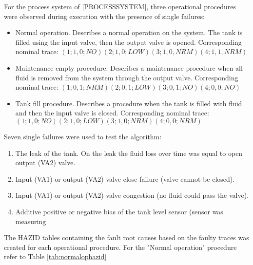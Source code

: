 \documentclass[conference]{IEEEtran}
\begin{document}
For the process system of \ref{PROCESSSYSTEM}, three operational procedures were observed during execution with the presence of single failures:
\begin{itemize}
\item Normal operation. Describes a normal operation on the system. The tank is filled using the input valve, then the output valve is opened. Corresponding nominal trace:
$(1;1,0;NO) (2;1,0;LOW) (3;1,0,NRM) (4;1,1,NRM)$
\item Maintenance empty procedure. Describes a maintenance procedure when all fluid is removed from the system through the output valve. Corresponding nominal trace:
$(1;0,1;NRM)	(2;0,1;LOW) (3;0,1;NO) (4;0,0;NO)$
\item Tank fill procedure. Describes a procedure when the tank is filled with fluid and then the input valve is closed. Corresponding nominal trace:
$(1;1,0;NO) (2;1,0;LOW) (3;1,0;NRM) (4;0,0;NRM)$
\end{itemize}

Seven single failures were used to test the algorithm:
\begin{enumerate}
\item The leak of the tank. On the leak the fluid loss over time was equal to open output (VA2) valve.
\item Input (VA1) or output (VA2) valve close failure (valve cannot be closed).
\item Input (VA1) or output (VA2) valve congestion (no fluid could pass the valve).
\item Additive positive or negative bias of the tank level sensor (sensor was measuring 
\end{enumerate}

The HAZID tables containing the fault root causes based on the faulty traces was created for each operational procedure. For the "Normal operation" procedure refer to Table \ref{tab:normalophazid}
\end{document}
